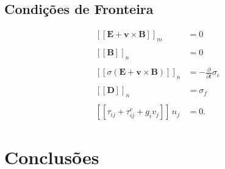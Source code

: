 \subsection{Condi\c{c}\~oes de Fronteira}

\begin{align*}
\left[\left[\mathbf{E}+\mathbf{v}\times\mathbf{B}\right]\right]_m&=0\\\\
\left[\left[\mathbf{B}\right]\right]_n&=0\\\\
\left[\left[\sigma(\mathbf{E}+\mathbf{v}\times\mathbf{B})\right]\right]_n&=-\frac{\partial}{\partial t}\sigma_e\\\\
\left[\left[\mathbf{D}\right]\right]_n&=\sigma_f\\\\
\left[\left[\tau_{ij}+\tau^e_{ij}+g_iv_j\right]\right]\,n_j&=0.
\end{align*}





\section{Conclus\~oes}